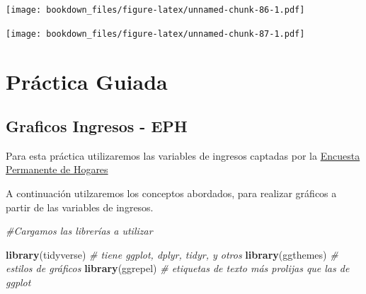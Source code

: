 \documentclass[]{book}
\newenvironment{Shaded}{\begin{snugshade}}{\end{snugshade}}
\newcommand{\CommentTok}[1]{\textcolor[rgb]{0.56,0.35,0.01}{\textit{#1}}}
\newcommand{\DataTypeTok}[1]{\textcolor[rgb]{0.13,0.29,0.53}{#1}}
\newcommand{\DecValTok}[1]{\textcolor[rgb]{0.00,0.00,0.81}{#1}}
\newcommand{\KeywordTok}[1]{\textcolor[rgb]{0.13,0.29,0.53}{\textbf{#1}}}
\newcommand{\NormalTok}[1]{#1}
\newcommand{\OperatorTok}[1]{\textcolor[rgb]{0.81,0.36,0.00}{\textbf{#1}}}
\newcommand{\StringTok}[1]{\textcolor[rgb]{0.31,0.60,0.02}{#1}}
\begin{document}
\texttt{[image: bookdown\_files/figure-latex/unnamed-chunk-86-1.pdf]}

\begin{Shaded}
\end{Shaded}

\texttt{[image: bookdown\_files/figure-latex/unnamed-chunk-87-1.pdf]}

\hypertarget{practica-guiada-2}{%
\section{Práctica Guiada}\label{practica-guiada-2}}

\hypertarget{graficos-ingresos---eph}{%
\subsection{Graficos Ingresos - EPH}\label{graficos-ingresos---eph}}

Para esta práctica utilizaremos las variables de ingresos captadas por la \href{https://www.indec.gob.ar/indec/web/Institucional-Indec-BasesDeDatos}{Encuesta Permanente de Hogares}

A continuación utilzaremos los conceptos abordados, para realizar gráficos a partir de las variables de ingresos.

\begin{Shaded}
\begin{Highlighting}[]
\CommentTok{#Cargamos las librerías a utilizar}

\KeywordTok{library}\NormalTok{(tidyverse) }\CommentTok{# tiene ggplot, dplyr, tidyr, y otros}
\KeywordTok{library}\NormalTok{(ggthemes)  }\CommentTok{# estilos de gráficos}
\KeywordTok{library}\NormalTok{(ggrepel)   }\CommentTok{# etiquetas de texto más prolijas que las de ggplot}
\end{Highlighting}
\end{Shaded}
\end{document}
